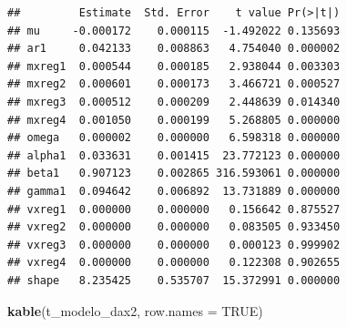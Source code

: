 \documentclass[
  11pt,
]{article}
\newenvironment{Shaded}{\begin{snugshade}}{\end{snugshade}}
\newcommand{\DataTypeTok}[1]{\textcolor[rgb]{0.13,0.29,0.53}{#1}}
\newcommand{\DecValTok}[1]{\textcolor[rgb]{0.00,0.00,0.81}{#1}}
\newcommand{\KeywordTok}[1]{\textcolor[rgb]{0.13,0.29,0.53}{\textbf{#1}}}
\newcommand{\NormalTok}[1]{#1}
\newcommand{\OperatorTok}[1]{\textcolor[rgb]{0.81,0.36,0.00}{\textbf{#1}}}
\newcommand{\OtherTok}[1]{\textcolor[rgb]{0.56,0.35,0.01}{#1}}
\newcommand{\StringTok}[1]{\textcolor[rgb]{0.31,0.60,0.02}{#1}}
\begin{document}
\begin{Shaded}
\end{Shaded}

\begin{verbatim}
##         Estimate  Std. Error    t value Pr(>|t|)
## mu     -0.000172    0.000115  -1.492022 0.135693
## ar1     0.042133    0.008863   4.754040 0.000002
## mxreg1  0.000544    0.000185   2.938044 0.003303
## mxreg2  0.000601    0.000173   3.466721 0.000527
## mxreg3  0.000512    0.000209   2.448639 0.014340
## mxreg4  0.001050    0.000199   5.268805 0.000000
## omega   0.000002    0.000000   6.598318 0.000000
## alpha1  0.033631    0.001415  23.772123 0.000000
## beta1   0.907123    0.002865 316.593061 0.000000
## gamma1  0.094642    0.006892  13.731889 0.000000
## vxreg1  0.000000    0.000000   0.156642 0.875527
## vxreg2  0.000000    0.000000   0.083505 0.933450
## vxreg3  0.000000    0.000000   0.000123 0.999902
## vxreg4  0.000000    0.000000   0.122308 0.902655
## shape   8.235425    0.535707  15.372991 0.000000
\end{verbatim}

\begin{Shaded}
\begin{Highlighting}[]
\KeywordTok{kable}\NormalTok{(t_modelo_dax2, }\DataTypeTok{row.names =} \OtherTok{TRUE}\NormalTok{)}
\end{Highlighting}
\end{Shaded}
\end{document}
